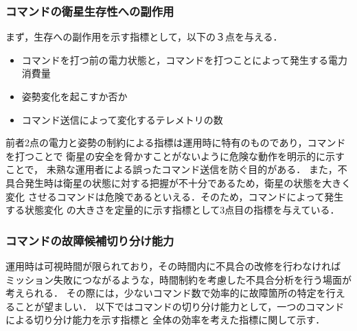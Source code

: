 \documentclass[11pt]{jsarticle}%
\begin{document}
\begin{multicols}{2}
  \subsubsection{コマンドの衛星生存性への副作用}
  まず，生存への副作用を示す指標として，以下の３点を与える．
\vspace{-1zh}
\begin{itemize}
    \item コマンドを打つ前の電力状態と，コマンドを打つことによって発生する電力消費量
    \item 姿勢変化を起こすか否か
    \item コマンド送信によって変化するテレメトリの数
  \end{itemize}
  前者2点の電力と姿勢の制約による指標は運用時に特有のものであり，コマンドを打つことで
  衛星の安全を脅かすことがないように危険な動作を明示的に示すことで，
  未熟な運用者による誤ったコマンド送信を防ぐ目的がある．
  また，不具合発生時は衛星の状態に対する把握が不十分であるため，衛星の状態を大きく変化
  させるコマンドは危険であるといえる．そのため，コマンドによって発生する状態変化
  の大きさを定量的に示す指標として3点目の指標を与えている．
\vspace{-1zh}
\subsubsection{コマンドの故障候補切り分け能力}
  運用時は可視時間が限られており，その時間内に不具合の改修を行わなければ
  ミッション失敗につながるような，時間制約を考慮した不具合分析を行う場面が考えられる．
  その際には，少ないコマンド数で効率的に故障箇所の特定を行えることが望ましい．
  以下ではコマンドの切り分け能力として，一つのコマンドによる切り分け能力を示す指標と
  全体の効率を考えた指標に関して示す．


\end{multicols}
\end{document}

